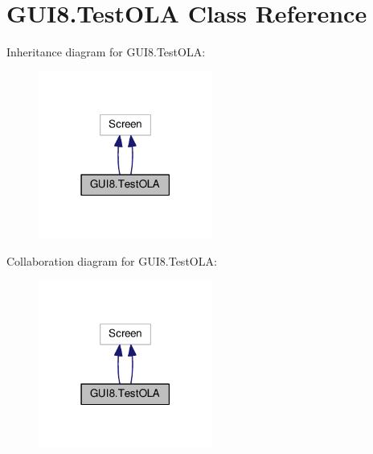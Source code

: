 \hypertarget{classGUI8_1_1TestOLA}{}\section{G\+U\+I8.\+Test\+O\+LA Class Reference}
\label{classGUI8_1_1TestOLA}


Inheritance diagram for G\+U\+I8.\+Test\+O\+LA\+:
\nopagebreak
\begin{figure}[H]
\begin{center}
\leavevmode
\includegraphics[width=162pt]{classGUI8_1_1TestOLA__inherit__graph}
\end{center}
\end{figure}


Collaboration diagram for G\+U\+I8.\+Test\+O\+LA\+:
\nopagebreak
\begin{figure}[H]
\begin{center}
\leavevmode
\includegraphics[width=162pt]{classGUI8_1_1TestOLA__coll__graph}
\end{center}
\end{figure}
